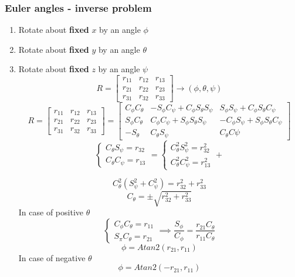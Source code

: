 \documentclass{article}
\begin{document}
\subsubsection{Euler angles - inverse problem}
    \begin{enumerate}
        \item Rotate about \textbf{fixed} $x$ by an angle $\phi$
        \item Rotate about \textbf{fixed} $y$ by an angle $\theta$
        \item Rotate about \textbf{fixed} $z$ by an angle $\psi$\\
        $$ R = 
        \begin{bmatrix}
        r_{11} & r_{12} & r_{13} \\
        r_{21} & r_{22} & r_{23} \\
        r_{31} & r_{32} & r_{33}
        \end{bmatrix} \xrightarrow[]{} { (\phi,  \theta, \psi) }
        $$
        $$
        R = 
        \begin{bmatrix}
        r_{11} & r_{12} & r_{13} \\
        r_{21} & r_{22} & r_{23} \\
        r_{31} & r_{32} & r_{33}
        \end{bmatrix} = 
        \begin{bmatrix}
        C_\phi C_\theta & -S_\phi C_\psi + C_\phi S_\theta S_\psi & S_\phi S_\psi + C_\phi S_\theta C_\psi \\
        S_\phi C_\theta & C_\phi C_\psi + S_\phi S_\theta S_\psi & -C_\phi S_\psi + S_\phi S_\theta C_\psi \\
        -S_\theta & C_\theta S_\psi & C_\theta C\psi 
        \end{bmatrix}
    $$
    \begin{equation}
    \begin{cases}
         C_\theta S_\psi = r_{32} \\
         C_\theta C_\psi = r_{13}   
    \end{cases} =
    \begin{cases}
         C^{2}_\theta S^{2}_\psi = r^{2}_{32} \\
         C^{2}_\theta C^{2}_\psi = r^{2}_{13}   
    \end{cases} +
    \end{equation}
    
    
    $$C^{2}_{\theta}(S^{2}_{\psi}+C^{2}_\psi) = r^{2}_{32} + r^{2}_{33} $$
    $$ C_\theta = \pm\sqrt{r^{2}_{32} + r^{2}_{33}} $$
In case of positive $\theta$    
    \begin{equation}
    \begin{cases}
         C_\phi C_\theta = r_{11} \\
         S_\pi C_\theta = r_{21}   
    \end{cases} \implies
     \frac{S_\phi}{C_\phi} = \frac{r_{21} C_\theta}{r_{11} C_\theta}
    \end{equation}
    $$ \phi = Atan2(r_{21},r_{11}) $$
In case of negative $\theta$ 
    $$ \phi = Atan2(-r_{21},r_{11}) $$
    

\end{enumerate}
\end{document}
